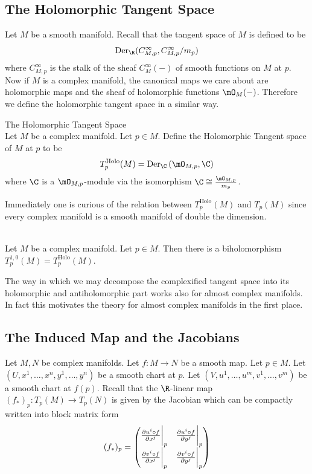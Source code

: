 \documentclass[a4paper]{article}
\begin{document}
\subsection{The Holomorphic Tangent Space}
Let $M$ be a smooth manifold. Recall that the tangent space of $M$ is defined to be $$\text{Der}_\R(C_{M,p}^\infty,C_{M,p}^\infty/m_p)$$ where $C_{M,p}^\infty$ is the stalk of the sheaf $C_M^\infty(-)$ of smooth functions on $M$ at $p$. Now if $M$ is a complex manifold, the canonical maps we care about are holomorphic maps and the sheaf of holomorphic functions $\mO_M(-)$. Therefore we define the holomorphic tangent space in a similar way. 

\begin{defn}{The Holomorphic Tangent Space}{}\\
Let $M$ be a complex manifold. Let $p\in M$. Define the Holomorphic Tangent space of $M$ at $p$ to be $$T_p^{\text{Holo}}(M)=\text{Der}_\C\left(\mO_{M,p},\C\right)$$ where $\C$ is a $\mO_{M,p}$-module via the isomorphism $\C\cong\frac{\mO_{M,p}}{m_p}$. 
\end{defn}

Immediately one is curious of the relation between $T_p^\text{Holo}(M)$ and $T_p(M)$ since every complex manifold is a smooth manifold of double the dimension. 

\begin{prp}{}{}\\
Let $M$ be a complex manifold. Let $p\in M$. Then there is a biholomorphism $T_p^{1,0}(M)=T_p^\text{Holo}(M)$. 
\end{prp}


The way in which we may decompose the complexified tangent space into its holomorphic and antiholomorphic part works also for almost complex manifolds. In fact this motivates the theory for almost complex manifolds in the first place. 

\subsection{The Induced Map and the Jacobians}
Let $M,N$ be complex manifolds. Let $f:M\to N$ be a smooth map. Let $p\in M$. Let $(U,x^1,\dots,x^n,y^1,\dots,y^n)$ be a smooth chart at $p$. Let $(V,u^1,\dots,u^m,v^1,\dots,v^m)$ be a smooth chart at $f(p)$. Recall that the $\R$-linear map $(f_\ast)_p:T_p(M)\to T_p(N)$ is given by the Jacobian which can be compactly written into block matrix form $$(f_\ast)_p=\begin{pmatrix}
\frac{\partial u^i\circ f}{\partial x^j}\bigg{|}_p & \frac{\partial u^i\circ f}{\partial y^j}\bigg{|}_p\\
\frac{\partial v^i\circ f}{\partial x^j}\bigg{|}_p & \frac{\partial v^i\circ f}{\partial y^j}\bigg{|}_p
\end{pmatrix}$$
\end{document}
